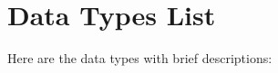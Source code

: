 \section{Data Types List}
Here are the data types with brief descriptions:\begin{DoxyCompactList}
\item{}
\end{DoxyCompactList}
